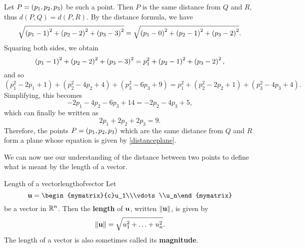 \begin{solution}
  Let $P = \left(p_1,p_2,p_3\right)$ be such a point. Then $P$ is the same
  distance from $Q$ and $R$, thus $d(P,Q)=d(P,R)$. By the distance
  formula, we have
  \begin{equation*}
    \sqrt{\left(p_1-1\right)^{2}+\left(p_2-2\right)^{2}+\left(p_3-3\right)^{2}}=
    \sqrt{\left(p_1-0\right)^{2}+\left(p_2-1\right)^{2}+\left(p_3-2\right)^{2}}.
  \end{equation*}
  Squaring both sides, we obtain 
  \begin{equation*}
    \left(p_1 -1\right) ^{2}+\left(p_2 -2\right) ^{2}+\left(p_3 -3\right)
    ^{2}=p_1^{2}+\left(p_2-1\right) ^{2}+\left(p_3 -2\right) ^{2},
  \end{equation*}
  and so
  \begin{equation*}
    \allowbreak (p_1^{2}-2p_1+1)+(p_2^{2}-4p_2+4)+(p_3^{2}-6p_3+9)=p_1^{2}+(p_2^{2}-2p_2+1)+(p_3^{2}-4p_3+4).
  \end{equation*}
  Simplifying, this becomes
  \begin{equation*}
    -2p_1-4p_2-6p_3+14=-2p_2-4p_3+5,
  \end{equation*}
  which can finally be written as 
  \begin{equation}\label{distanceplane}
    2p_1+2p_2+2p_3=9.
  \end{equation}
  Therefore, the points $P = \left(p_1,p_2,p_3\right)$ which are the same
  distance from $Q$ and $R$ form a plane whose equation is given by
  \eqref{distanceplane}.
\end{solution}

We can now use our understanding of the distance between two points to
define what is meant by the length of a vector.

\begin{definition}{Length of a vector}{lengthofvector}
  Let
  \[
    \vect{u} = \begin{mymatrix}{c}u_1\\\vdots\\u_n\end{mymatrix}
  \]
  be a vector in $\mathbb{R}^n$. Then the
  \textbf{length} of
  $\mbox{\bf u}$, written $\left\|\mbox{\bf u}\right\|$, is given by
  \begin{equation*}
    \left\|\mbox{\bf u}\right\| = \sqrt{u_{1}^2 + \ldots + u_{n}^2}.
  \end{equation*}
  The length of a vector is also sometimes called its
  \textbf{magnitude}.
\end{definition}

